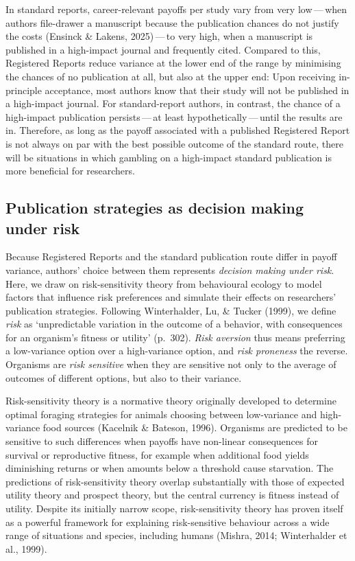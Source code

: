 \documentclass[
  british,
  a4paper,
  ,man,mask,floatsintext]{apa6}
\begin{document}
In standard reports, career-relevant payoffs per study vary from very low\(\,\)---\(\,\)when authors file-drawer a manuscript because the publication chances do not justify the costs (Ensinck \& Lakens, 2025)\(\,\)---\(\,\)to very high, when a manuscript is published in a high-impact journal and frequently cited.
Compared to this, Registered Reports reduce variance at the lower end of the range by minimising the chances of no publication at all, but also at the upper end:
Upon receiving in-principle acceptance, most authors know that their study will not be published in a high-impact journal.
For standard-report authors, in contrast, the chance of a high-impact publication persists\(\,\)---\(\,\)at least hypothetically\(\,\)---\(\,\)until the results are in.
Therefore, as long as the payoff associated with a published Registered Report is not always on par with the best possible outcome of the standard route, there will be situations in which gambling on a high-impact standard publication is more beneficial for researchers.

\subsection{Publication strategies as decision making under risk}\label{publication-strategies-as-decision-making-under-risk}

Because Registered Reports and the standard publication route differ in payoff variance, authors' choice between them represents \emph{decision making under risk}.
Here, we draw on risk-sensitivity theory from behavioural ecology to model factors that influence risk preferences and simulate their effects on researchers' publication strategies.
Following Winterhalder, Lu, \& Tucker (1999), we define \emph{risk} as `unpredictable variation in the outcome of a behavior, with consequences for an organism's fitness or utility' (p.~302).
\emph{Risk aversion} thus means preferring a low-variance option over a high-variance option, and \emph{risk proneness} the reverse.
Organisms are \emph{risk sensitive} when they are sensitive not only to the average of outcomes of different options, but also to their variance.

Risk-sensitivity theory is a normative theory originally developed to determine optimal foraging strategies for animals choosing between low-variance and high-variance food sources (Kacelnik \& Bateson, 1996).
Organisms are predicted to be sensitive to such differences when payoffs have non-linear consequences for survival or reproductive fitness, for example when additional food yields diminishing returns or when amounts below a threshold cause starvation.
The predictions of risk-sensitivity theory overlap substantially with those of expected utility theory and prospect theory, but the central currency is fitness instead of utility.
Despite its initially narrow scope, risk-sensitivity theory has proven itself as a powerful framework for explaining risk-sensitive behaviour across a wide range of situations and species, including humans (Mishra, 2014; Winterhalder et al., 1999).
\end{document}
